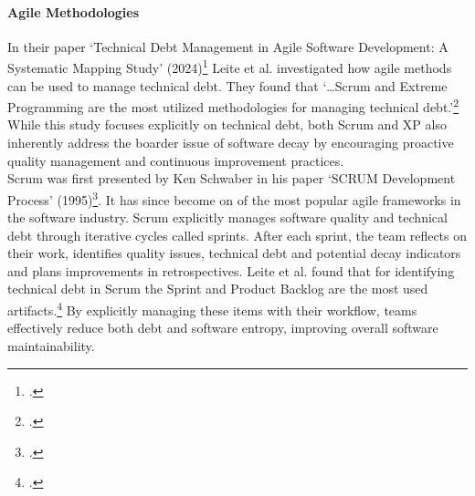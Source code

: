 \paragraph{Agile Methodologies}
In their paper `Technical Debt Management in Agile Software Development: A Systematic Mapping Study' (2024)\footcite{leiteTechnicalDebtManagement2024} Leite et al.
investigated how agile methods can be used to manage technical debt. They found that `\ldots Scrum and Extreme Programming are the most utilized methodologies 
for managing technical debt.'\footcite[318]{leiteTechnicalDebtManagement2024} While this study focuses explicitly on technical debt, both Scrum and \ac{XP}
also inherently address the boarder issue of software decay by encouraging proactive quality management and continuous improvement practices.\\
Scrum was first presented by Ken Schwaber in his paper `SCRUM Development Process' (1995)\footcite{schwaberSCRUMDevelopmentProcess1997}. 
It has since become on of the most popular agile frameworks in the software industry. Scrum explicitly manages software quality and technical debt through iterative cycles called sprints.
After each sprint, the team reflects on their work, identifies quality issues, technical debt and potential decay indicators and plans improvements in
retrospectives. Leite et al. found that for identifying technical debt in Scrum the Sprint and Product Backlog are the most used artifacts.\footcite[315]{leiteTechnicalDebtManagement2024}
By explicitly managing these items with their workflow, teams effectively reduce both debt and software entropy, improving overall software maintainability.\\

